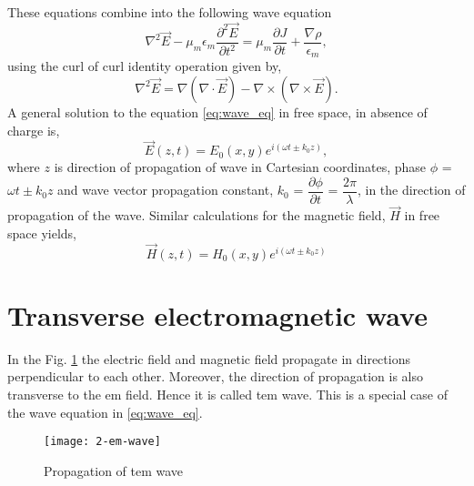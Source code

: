 \documentclass[../report.tex]{subfiles}
\begin{document}
\noindent These equations combine into the following wave equation
\begin{equation}\label{eq:wave_eq}
\nabla^2 \vec{E} -  \mu_m\epsilon_m\frac{\partial^2 \vec{E}}{\partial t^2} = \mu_m\frac{\partial J}{\partial t} + \frac{\nabla\rho}{\epsilon_m},	
\end{equation}
using the curl of curl identity operation given by, 
\begin{equation}\label{eq:curl_of_curl}
\nabla^2 \vec{E} = \nabla(\nabla \cdot \vec{E}) - \nabla\times(\nabla\times \vec{E}).
\end{equation}
A general solution to the equation \ref{eq:wave_eq} in free space, in absence of charge is,
\begin{equation}\label{eq:wave_sol_electric}
\vec{E}(z,t)=E_{0}(x,y)e^{i\left(\omega t \pm k_{0}z\right)},
\end{equation}
where $z$ is direction of propagation of wave in Cartesian coordinates, phase $\phi$ = $\omega t \pm k_{0}z$ and wave vector propagation constant, $k_0$ = $\dfrac {\partial \phi } {\partial t}$ = $\dfrac {2\pi } {\lambda }$, in the direction of propagation of the wave. Similar calculations for the magnetic field, $\vec{H}$ in free space yields, 		
\begin{equation}\label{eq:wave_sol_magnetic}
\vec{H}(z,t)=H_{0}(x,y)e^{i\left(\omega t \pm k_{0}z\right)}
\end{equation}

\section{Transverse electromagnetic wave}
\noindent In the Fig. \ref{fig:2_em_wave} the electric field and magnetic field propagate in directions perpendicular to each other. Moreover, the direction of propagation is also transverse to the \gls{em} field. Hence it is called \gls{tem} wave. This is a special case of the wave equation in \ref{eq:wave_eq}.
\begin{figure}[H]
	\centering
	\texttt{[image: 2-em-wave]}
	\caption{Propagation of \gls{tem} wave}
	\label{fig:2_em_wave}
\end{figure}
\end{document}
